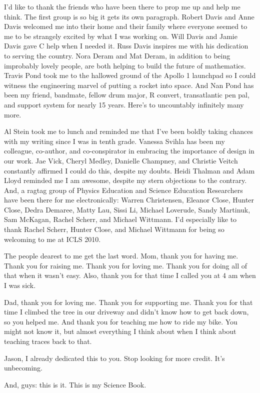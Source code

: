 I'd like to thank the friends who have been there to prop me up and help
me think. The first group is so big it gets its own paragraph. Robert
Davis and Anne Davis welcomed me into their home and their family where
everyone seemed to me to be strangely excited by what I was working on.
Will Davis and Jamie Davis gave C help when I needed it. Russ Davis
inspires me with his dedication to serving the country. Nora Deram and
Mat Deram, in addition to being improbably lovely people, are both
helping to build the future of mathematics. Travis Pond took me to the
hallowed ground of the Apollo 1 launchpad so I could witness the
engineering marvel of putting a rocket into space. And Nan Pond has been
my friend, bandmate, fellow drum major, R convert, transatlantic pen
pal, and support system for nearly 15 years. Here's to uncountably
infinitely many more.

Al Stein took me to lunch and reminded me that I've been boldly taking
chances with my writing since I was in tenth grade. Vanessa Svihla has
been my colleague, co-author, and co-conspirator in embracing the
importance of design in our work. Jae Vick, Cheryl Medley, Danielle
Champney, and Christie Veitch constantly affirmed I could do this,
despite my doubts. Heidi Thalman and Adam Lloyd reminded me I am
awesome, despite my stern objections to the contrary. And, a ragtag
group of Physics Education and Science Education Researchers have been
there for me electronically: Warren Christensen, Eleanor Close, Hunter
Close, Dedra Demaree, Matty Lau, Sissi Li, Michael Loverude, Sandy
Martinuk, Sam McKagan, Rachel Scherr, and Michael Wittmann. I'd
especially like to thank Rachel Scherr, Hunter Close, and Michael
Wittmann for being so welcoming to me at ICLS 2010.

The people dearest to me get the last word. Mom, thank you for having
me. Thank you for raising me. Thank you for loving me. Thank you for
doing all of that when it wasn't easy. Also, thank you for that time I
called you at 4 am when I was sick.

Dad, thank you for loving me. Thank you for supporting me. Thank you for
that time I climbed the tree in our driveway and didn't know how to get
back down, so you helped me. And thank you for teaching me how to ride
my bike. You might not know it, but almost everything I think about when
I think about teaching traces back to that.

Jason, I already dedicated this to you. Stop looking for more credit.
It's unbecoming.

And, guys: this is it. This is my Science Book.

